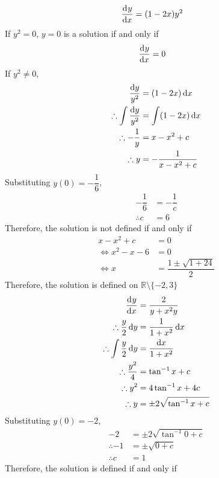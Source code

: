 \documentclass[fleqn, a4paper, 12pt, oneside]{amsart}
\theoremstyle{definition}
\theoremstyle{theorem}
\begin{document}
\begin{solution}
	\begin{tasks}
		\task
			\begin{align*}
				\dod{y}{x} &= (1 - 2x) y^2
			\end{align*}
			If $y^2 = 0$, 
			$y = 0$ is a solution if and only if
			\begin{align*}
				\dod{y}{x} &= 0
			\end{align*}
			If $y^2 \neq 0$,
			\begin{align*}
				\dfrac{\dif y}{y^2} &= (1- 2x) \dif x\\
				\therefore \int \dfrac{\dif y}{y^2} &= \int (1 - 2x) \dif x\\
				\therefore -\dfrac{1}{y} &= x - x^2 + c\\
				\therefore y &= -\dfrac{1}{x - x^2 + c}
			\end{align*}
			Substituting $y(0) = -\dfrac{1}{6}$,
			\begin{align*}
				-\dfrac{1}{6} &= -\dfrac{1}{c}\\
				\therefore c &= 6
			\end{align*}
			Therefore, the solution is not defined if and only if
			\begin{align*}
			 x - x^2 + c &= 0\\
			 \iff x^2 - x - 6 &= 0\\
			 \iff x &= \dfrac{1 \pm \sqrt{1 + 24}}{2}
			\end{align*}
			Therefore, the solution is defined on $\mathbb{R} \setminus \{-2, 3\}$
		\task 
			\begin{align*}
				\dod{y}{x} &= \dfrac{2}{y + x^2y}\\
				\therefore \dfrac{y}{2} \dif y &= \dfrac{1}{1 + x^2} \dif x\\
				\therefore \int \dfrac{y}{2} \dif y &= \dfrac{\dif x}{1 + x^2}\\
				\therefore \dfrac{y^2}{4} &= \tan^{-1} x + c\\
				\therefore y^2 &= 4 \tan^{-1} x + 4c\\
				\therefore y &= \pm 2 \sqrt{\tan^{-1} x + c}
			\end{align*}
			Substituting $y(0) = -2$,
			\begin{align*}
				-2 &= \pm 2 \sqrt{\tan^{-1} 0 + c}\\
				\therefore -1 &= \pm \sqrt{0 + c}\\
				\therefore c &= 1
			\end{align*}
			Therefore, the solution is defined if and only if

\end{tasks}
\end{solution}
\end{document}
